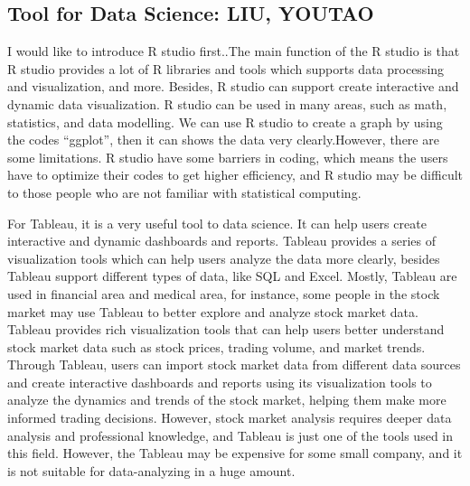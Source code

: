 \documentclass[a4paper, 11pt]{report}
\begin{document}
\subsection{Tool for Data Science: LIU, YOUTAO}
I would like to introduce R studio first..The main function of the R studio is that R studio provides a lot of R libraries and tools which supports data processing and visualization, and more. Besides, R studio can support create interactive and dynamic data visualization. R studio can be used in many areas, such as math, statistics, and data modelling. We can use R studio to create a graph by using the codes  “ggplot”, then it can shows the data very clearly.However, there are some limitations. R studio have some barriers in coding, which means the users have to optimize their codes to get higher efficiency, and R studio may be difficult to those people who are not familiar with statistical computing.

For Tableau, it is a very useful tool to data science. It can help users create interactive and dynamic dashboards and reports. Tableau provides a series of visualization tools which can help users analyze the data more clearly, besides Tableau support different types of data, like SQL and Excel. Mostly, Tableau are used in financial area and medical area, for instance, some people in the stock market may use Tableau to better explore and analyze stock market data. Tableau provides rich visualization tools that can help users better understand stock market data such as stock prices, trading volume, and market trends. Through Tableau, users can import stock market data from different data sources and create interactive dashboards and reports using its visualization tools to analyze the dynamics and trends of the stock market, helping them make more informed trading decisions. However, stock market analysis requires deeper data analysis and professional knowledge, and Tableau is just one of the tools used in this field. However, the Tableau may be expensive for some small company, and it is not suitable for data-analyzing in a huge amount.
\end{document}
